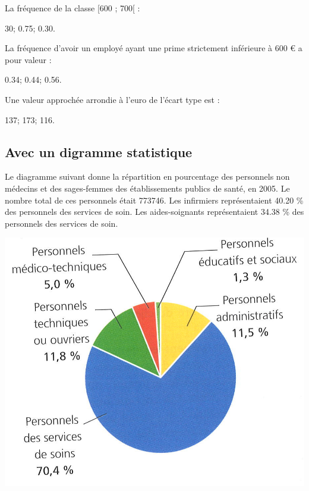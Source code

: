 \begin{questions}
	\question La fréquence de la classe [600 ; 700[ :
	
	\begin{oneparcheckboxes}
		\choice \num{30};
		\choice \num{0.75};
		\CorrectChoice \num{0.30}.
	\end{oneparcheckboxes} 

	\question La fréquence d'avoir un employé ayant une prime strictement inférieure à 600 € a pour valeur :
	
	\begin{oneparcheckboxes}
		\choice \num{0.34};
		\CorrectChoice \num{0.44};
		\choice \num{0.56}.
	\end{oneparcheckboxes} 

	\question Une valeur approchée arrondie à l'euro de l'écart type est :
	
	\begin{oneparcheckboxes}
		\choice \num{137};
		\choice \num{173};
		\CorrectChoice \num{116}.
	\end{oneparcheckboxes} 
\end{questions}  

\subsection{Avec un digramme statistique}

\begin{multicols}{2}
	Le diagramme suivant donne la répartition en pourcentage des personnels non médecins et des sages-femmes des établissements publics de santé, en 2005.
	Le nombre total de ces personnels était \num{773746}.
	Les infirmiers représentaient \num{40.20} \% des personnels des services de soin. Les aides-soignants représentaient \num{34.38} \% des personnels des services de soin.
	
	
	
	\begin{center}
		\includegraphics[scale=0.9]{img/repartition}
	\end{center}
	
\end{multicols}


